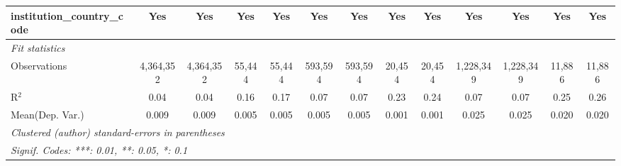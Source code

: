 \begin{tabular}{lcccccccccccc}
   institution\_country\_code               & Yes            & Yes              & Yes            & Yes             & Yes            & Yes              & Yes            & Yes            & Yes           & Yes             & Yes            & Yes\\  
   \midrule
   \emph{Fit statistics}\\
   Observations                             & 4,364,352      & 4,364,352        & 55,444         & 55,444          & 593,594        & 593,594          & 20,454         & 20,454         & 1,228,349     & 1,228,349       & 11,886         & 11,886\\  
   R$^2$                                    & 0.04           & 0.04             & 0.16           & 0.17            & 0.07           & 0.07             & 0.23           & 0.24           & 0.07          & 0.07            & 0.25           & 0.26\\  
Mean(Dep. Var.) & 0.009 & 0.009 & 0.005 & 0.005 & 0.005 & 0.005 & 0.001 & 0.001 & 0.025 & 0.025 & 0.020 & 0.020 \\
   \midrule \midrule
   \multicolumn{13}{l}{\emph{Clustered (author) standard-errors in parentheses}}\\
   \multicolumn{13}{l}{\emph{Signif. Codes: ***: 0.01, **: 0.05, *: 0.1}}\\
\end{tabular}
\par\endgroup

